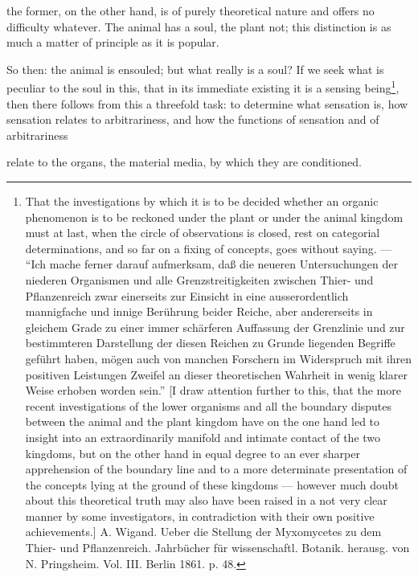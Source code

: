 \documentclass[12pt,a4paper]{book}
\begin{document}
\setcounter{footnote}{0}
the former, on the other hand, is of purely theoretical nature and offers no
difficulty whatever. The animal has a soul, the plant not; this distinction is as
much a matter of principle as it is popular.

So then: the animal is ensouled; but what really is a soul? If we seek what is
peculiar to the soul in this, that in its immediate existing it is a sensing
being\footnote{That the investigations by which it is to be decided whether an
organic phenomenon is to be reckoned under the plant or under the animal kingdom
must at last, when the circle of observations is closed, rest on categorial
determinations, and so far on a fixing of concepts, goes without saying. --- ``Ich
mache ferner darauf aufmerksam, daß die neueren Untersuchungen der niederen
Organismen und alle Grenzstreitigkeiten zwischen Thier- und Pflanzenreich zwar
einerseits zur Einsicht in eine ausserordentlich mannigfache und innige Berührung
beider Reiche, aber andererseits in gleichem Grade zu einer immer schärferen
Auffassung der Grenzlinie und zur bestimmteren Darstellung der diesen Reichen zu
Grunde liegenden Begriffe geführt haben, mögen auch von manchen Forschern im
Widerspruch mit ihren positiven Leistungen Zweifel an dieser theoretischen Wahrheit
in wenig klarer Weise erhoben worden sein.'' [I draw attention further to this,
that the more recent investigations of the lower organisms and all the boundary
disputes between the animal and the plant kingdom have on the one hand led to
insight into an extraordinarily manifold and intimate contact of the two kingdoms,
but on the other hand in equal degree to an ever sharper apprehension of the
boundary line and to a more determinate presentation of the concepts lying at the
ground of these kingdoms --- however much doubt about this theoretical truth may
also have been raised in a not very clear manner by some investigators, in
contradiction with their own positive achievements.] A. Wigand. Ueber die Stellung
der Myxomycetes zu dem Thier- und Pflanzenreich. Jahrbücher für wissenschaftl.
Botanik. herausg. von N. Pringsheim. Vol. III. Berlin 1861. p. 48.}, then there
follows from this a threefold task: to determine what sensation is, how sensation
relates to arbitrariness, and how the functions of sensation and of arbitrariness

\setcounter{footnote}{0}
relate to the organs, the material media, by which they are conditioned.
\end{document}
